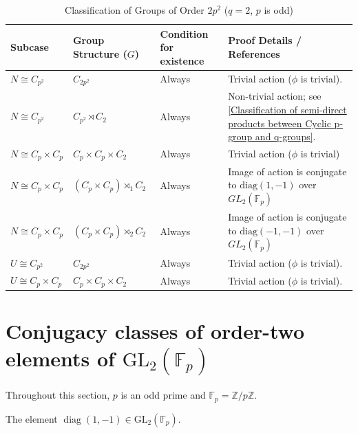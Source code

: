 \begin{table}[htbp]
\centering
\caption{Classification of Groups of Order $2p^2$ ($q = 2$, $p$ is odd)}
\label{tab:groups_p2q_classification}
\begin{tabular}{ll p{3.2cm} p{6cm}}
\toprule
\textbf{Subcase} & \textbf{Group Structure ($G$)} & \textbf{Condition for existence} & \textbf{Proof Details / References} \\
\midrule
\quad $N \cong C_{p^2}$ & $C_{2p^2}$ & Always & Trivial action ($\phi$ is trivial). \\
\quad $N \cong C_{p^2}$ & $C_{p^2} \rtimes C_2$ & Always & Non-trivial action; see \ref{Classification of semi-direct products between Cyclic p-group and q-groups}. \\
\addlinespace
\quad $N \cong C_p \times C_p$ & $C_p \times C_p \times C_2$ & Always & Trivial action ($\phi$ is trivial) \\
\quad $N \cong C_p \times C_p$ & $(C_p \times C_p) \rtimes_1 C_2$ & Always & Image of action is conjugate to $\text{diag}(1, -1)$ over $GL_2(\mathbb{F}_p)$ \\
\quad $N \cong C_p \times C_p$ & $(C_p \times C_p) \rtimes_2 C_2$ & Always & Image of action is conjugate to $\text{diag}(-1, -1)$ over $GL_2(\mathbb{F}_p)$ \\
\midrule
\quad $U \cong C_{p^2}$ & $C_{2p^2}$ & Always & Trivial action ($\phi$ is trivial). \\
\addlinespace
\quad $U \cong C_p \times C_p$ & $C_p \times C_p \times C_2$ & Always & Trivial action ($\phi$ is trivial). \\
\bottomrule
\end{tabular}
\end{table}




\section{Conjugacy classes of order-two elements of \texorpdfstring{$\mathrm{GL}_2(\mathbb{F}_p)$}{GL2(Fp)}}

Throughout this section, $p$ is an odd prime and $\mathbb{F}_p = \mathbb{Z}/p\mathbb{Z}$.

\begin{definition}
  \label{def:gl2-diag-one-neg-one}
  \leanok
  The element $\operatorname{diag}(1, -1) \in \mathrm{GL}_2(\mathbb{F}_p)$.
\end{definition}


